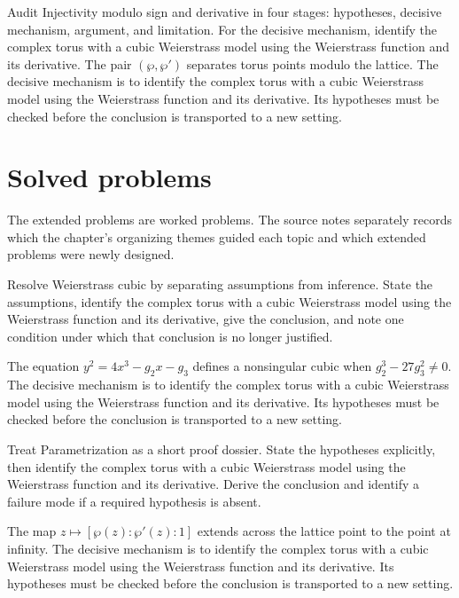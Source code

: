 \begin{example}\label{ex:iv31-worked-04}
Audit Injectivity modulo sign and derivative in four stages: hypotheses, decisive mechanism, argument, and limitation. For the decisive mechanism, identify the complex torus with a cubic Weierstrass model using the Weierstrass function and its derivative. The pair $(\wp,\wp')$ separates torus points modulo the lattice. The decisive mechanism is to identify the complex torus with a cubic Weierstrass model using the Weierstrass function and its derivative. Its hypotheses must be checked before the conclusion is transported to a new setting.
\end{example}

\section{Solved problems}
The extended problems are worked problems. The source notes separately records which the chapter's organizing themes guided each topic and which extended problems were newly designed.

\begin{problem}\label{prob:iv31-problem-01}
Resolve Weierstrass cubic by separating assumptions from inference. State the assumptions, identify the complex torus with a cubic Weierstrass model using the Weierstrass function and its derivative, give the conclusion, and note one condition under which that conclusion is no longer justified.
\end{problem}
\begin{solution}
The equation $y^2=4x^3-g_2x-g_3$ defines a nonsingular cubic when $g_2^3-27g_3^2\ne0$. The decisive mechanism is to identify the complex torus with a cubic Weierstrass model using the Weierstrass function and its derivative. Its hypotheses must be checked before the conclusion is transported to a new setting.
\end{solution}

\begin{problem}\label{prob:iv31-problem-02}
Treat Parametrization as a short proof dossier. State the hypotheses explicitly, then identify the complex torus with a cubic Weierstrass model using the Weierstrass function and its derivative. Derive the conclusion and identify a failure mode if a required hypothesis is absent.
\end{problem}
\begin{solution}
The map $z\mapsto[\wp(z):\wp'(z):1]$ extends across the lattice point to the point at infinity. The decisive mechanism is to identify the complex torus with a cubic Weierstrass model using the Weierstrass function and its derivative. Its hypotheses must be checked before the conclusion is transported to a new setting.
\end{solution}

